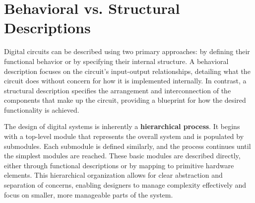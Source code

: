 

\section{Behavioral vs. Structural Descriptions}
Digital circuits can be described using two primary approaches: by defining their functional behavior or by specifying their internal structure. A behavioral description focuses on the circuit's input-output relationships, detailing what the circuit does without concern for how it is implemented internally. In contrast, a structural description specifies the arrangement and interconnection of the components that make up the circuit, providing a blueprint for how the desired functionality is achieved. 

The design of digital systems is inherently a \textbf{hierarchical process}. It begins with a top-level module that represents the overall system and is populated by submodules. Each submodule is defined similarly, and the process continues until the simplest modules are reached. These basic modules are described directly, either through functional descriptions or by mapping to primitive hardware elements. This hierarchical organization allows for clear abstraction and separation of concerns, enabling designers to manage complexity effectively and focus on smaller, more manageable parts of the system.

